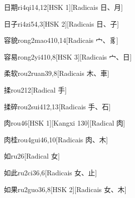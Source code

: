\begin{entry}{日期}{ri4qi1}{4,12}[HSK 1][Radicais ⽇、⽉]
\end{entry}

\begin{entry}{日子}{ri4zi5}{4,3}[HSK 2][Radicais ⽇、⼦]
\end{entry}

\begin{entry}{容貌}{rong2mao4}{10,14}[Radicais ⼧、⾘]
\end{entry}

\begin{entry}{容易}{rong2yi4}{10,8}[HSK 3][Radicais ⼧、⽇]
\end{entry}

\begin{entry}{柔软}{rou2ruan3}{9,8}[Radicais ⽊、⾞]
\end{entry}

\begin{entry}{揉}{rou2}{12}[Radical ⼿]
\end{entry}

\begin{entry}{揉碎}{rou2sui4}{12,13}[Radicais ⼿、⽯]
\end{entry}

\begin{entry}{肉}{rou4}{6}[HSK 1][Kangxi 130][Radical ⾁]
\end{entry}

\begin{entry}{肉桂}{rou4gui4}{6,10}[Radicais ⾁、⽊]
\end{entry}

\begin{entry}{如}{ru2}{6}[Radical ⼥]
\end{entry}

\begin{entry}{如此}{ru2ci3}{6,6}[Radicais ⼥、⽌]
\end{entry}

\begin{entry}{如果}{ru2guo3}{6,8}[HSK 2][Radicais ⼥、⽊]
\end{entry}

